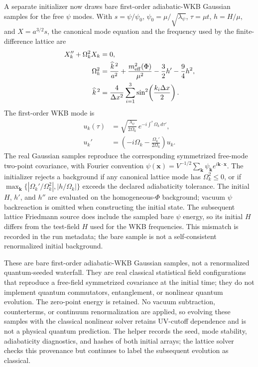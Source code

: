 \documentclass[epj]{svjour}
\begin{document}
A separate initializer now draws bare first-order adiabatic-WKB
Gaussian samples for the free $\psi$ modes. With
$s=\psi/\psi_0$, $\psi_0=\mu/\sqrt{\lambda_\psi}$,
$\tau=\mu t$, $h=H/\mu$, and $X=a^{3/2}s$, the canonical mode equation
and the frequency used by the finite-difference lattice are
\begin{align}
X_k''+\Omega_k^2X_k&=0,\\
\Omega_k^2&=\frac{\widehat{k}^{\,2}}{a^2}
+\frac{m_{\rm eff}^2(\Phi)}{\mu^2}
-\frac32 h'-\frac94h^2,\\
\widehat{k}^{\,2}&=\frac{4}{\Delta x^2}
\sum_{i=1}^3\sin^2\!\left(\frac{k_i\Delta x}{2}\right).
\end{align}
The first-order WKB mode is
\begin{equation}
\begin{aligned}
u_k(\tau)&=\sqrt{\frac{\lambda_\psi}{2\Omega_k}}\,
e^{-i\int^\tau\Omega_k\,d\tau'},\\
u_k'&=\left(-i\Omega_k-\frac{\Omega_k'}{2\Omega_k}\right)u_k .
\end{aligned}
\end{equation}
The real Gaussian samples reproduce the corresponding symmetrized
free-mode two-point covariance, with Fourier convention
$\psi(\mathbf{x})=V^{-1/2}\sum_{\mathbf{k}}\psi_{\mathbf{k}}
e^{i\mathbf{k}\cdot\mathbf{x}}$. The initializer rejects a background
if any canonical lattice mode has $\Omega_k^2\leq0$, or if
$\max_{\mathbf{k}}\{|\Omega_k'/\Omega_k^2|,|h/\Omega_k|\}$
exceeds the declared adiabaticity tolerance. The initial $H$, $h'$,
and $h''$ are evaluated on the homogeneous-$\Phi$ background; vacuum
$\psi$ backreaction is omitted when constructing the initial state.
The subsequent lattice Friedmann source does include the sampled bare
$\psi$ energy, so its initial $H$ differs from the test-field $H$ used
for the WKB frequencies. This mismatch is recorded in the run metadata;
the bare sample is not a self-consistent renormalized initial background.

These are bare first-order adiabatic-WKB Gaussian samples, not a
renormalized quantum-seeded waterfall. They are real classical
statistical field configurations that reproduce a free-field
symmetrized covariance at the initial time; they do not implement
quantum commutators, entanglement, or nonlinear quantum evolution.
The zero-point energy is retained. No vacuum subtraction,
counterterms, or continuum renormalization are applied, so evolving
these samples with the classical nonlinear solver retains UV-cutoff
dependence and is not a physical quantum prediction. The helper
records the seed, mode stability, adiabaticity diagnostics, and hashes
of both initial arrays; the lattice solver checks this provenance but
continues to label the subsequent evolution as classical.
\end{document}
